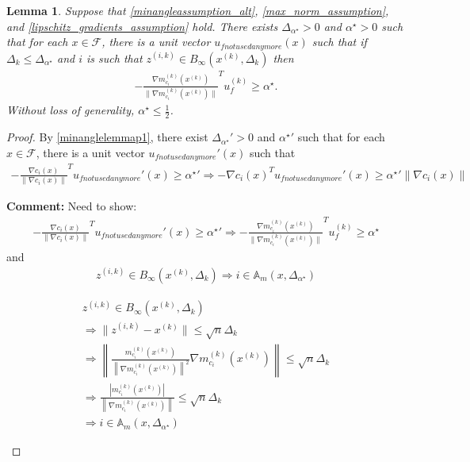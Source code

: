 \documentclass{article}
\newenvironment{comment}
  {\par\medskip
   \color{red}%
   \begin{framed}
   \textbf{Comment: }\ignorespaces}
 {\end{framed}
  \medskip}
\newtheorem{lemma}[theorem]{Lemma}
\theoremstyle{case}
\numberwithin{theorem}{subsection}
\newcommand{\dk}{\Delta_k}
\newcommand{\feasible}{{\mathcal F}}
\newcommand{\gmcik}{{\nabla m_{c_i}^{(k)}\left(\xk\right)}}
\newcommand{\minanglealpha}{{ \alpha^{\star} }}
\newcommand{\minangledelta}{{\Delta_{\alpha^{\star}}}}
\newcommand{\xk}{{x^{(k)}}}
\newcommand{\zik}{{z^{(i, k)}}}
\newcommand{\minangledir}{{u_{f not used anymore}}}
\newcommand{\minangledirk}{{u^{(k)}_f}}
\newcommand{\epsactivemodels}{{\mathbb A_{m}}}
\begin{document}
\color{red}
\begin{lemma}
\label{minanglelemmap2}
Suppose that \cref{minangleassumption_alt}, \cref{max_norm_assumption}, and \cref{lipschitz_gradients_assumption} hold.
There exists $\minangledelta > 0$ and $\minanglealpha > 0$ such that for each $x \in \feasible$, there is a unit vector $\minangledir(x)$ such that
if $\dk \le \minangledelta$ and $i$ is such that $\zik \in B_{\infty}(\xk, \dk)$
then
\begin{align*}
-\frac {\gmcik}{\|\gmcik\|} ^T\minangledirk \ge \minanglealpha.
\end{align*}
Without loss of generality, $\minanglealpha \le \frac 1 2$.
\end{lemma}
\begin{proof}
By \cref{minanglelemmap1}, there exist $\minangledelta' > 0$ and $\minanglealpha'$ such that for each $x \in \feasible$, 
there is a unit vector $\minangledir'(x)$ such that
\begin{align*}
-\frac {\nabla c_i(x)}{\|\nabla c_i(x)\|}^T \minangledir'(x) \ge \minanglealpha'
\Longrightarrow -\nabla c_i(x)^T \minangledir'(x) \ge \minanglealpha' \|\nabla c_i(x)\|
\end{align*}

\begin{comment}
Need to show:
\begin{align*}
-\frac {\nabla c_i(x)}{\|\nabla c_i(x)\|}^T \minangledir'(x) \ge \minanglealpha' \Longrightarrow -\frac {\gmcik}{\|\gmcik\|} ^T\minangledirk \ge \minanglealpha
\end{align*}
and
\begin{align*}
\zik \in B_{\infty}(\xk, \dk) \Longrightarrow i \in \epsactivemodels(x, \minangledelta)
\end{align*}


\begin{align*}
\zik \in B_{\infty}(\xk, \dk) \\
\Longrightarrow \|\zik - \xk\| \le \sqrt{n}\dk \\
\Longrightarrow \left\|\frac{m^{(k)}_{c_i}(\xk)}{\left\|\gmcik\right\|^2} \gmcik\right\| \le \sqrt{n}\dk \\
\Longrightarrow \frac{|m^{(k)}_{c_i}(\xk)|}{\left\|\gmcik\right\|}  \le \sqrt{n}\dk \\
\Longrightarrow i \in \epsactivemodels(x, \minangledelta)
\end{align*}

\end{comment}
\end{proof}
\color{black}
\end{document}
